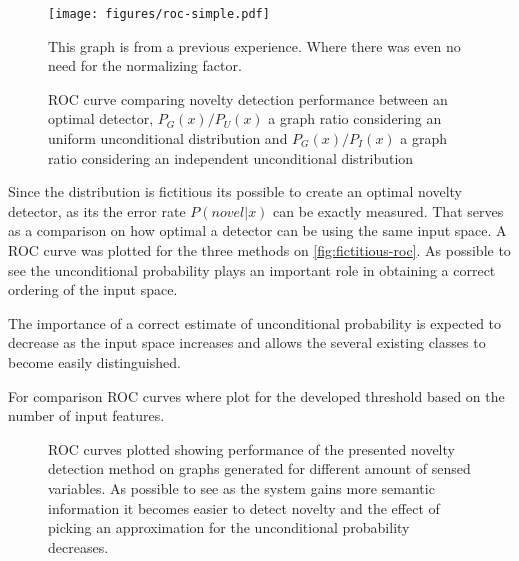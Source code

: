 \documentclass[runningheads,a4paper]{llncs}
\begin{document}
\begin{figure}[h!]
\centering
\texttt{[image: figures/roc-simple.pdf]}

This graph is from a previous experience. Where there was even no need for the normalizing factor.

\caption{\label{fig:fictitious-roc}ROC curve comparing novelty detection performance between an optimal detector,
         $P_G(x)/P_U(x)$ a graph ratio considering an uniform unconditional distribution and
         $P_G(x)/P_I(x)$ a graph ratio considering an independent unconditional distribution}
\end{figure}

Since the distribution is fictitious its possible to create an optimal novelty detector, as
its the error rate $P(novel|x)$ can be exactly measured.
That serves as a comparison on how optimal a detector can be using the same input space.
A ROC curve was plotted for the three methods on \autoref{fig:fictitious-roc}.
As possible to see the unconditional probability plays an important role in obtaining a correct
ordering of the input space.

The importance of a correct estimate of unconditional probability is expected to decrease as the
input space increases and allows the several existing classes to become easily distinguished.

For comparison ROC curves where plot for the developed threshold based on the number of input features.

\begin{figure}[h]
\centering

\qquad
{}

\qquad
{}

\caption{\label{fig:fictitious-roc-breakdown}ROC curves plotted showing performance of the
         presented novelty detection method on graphs generated for different amount of
         sensed variables.
         As possible to see as the system gains more semantic information it becomes easier
         to detect novelty and the effect of picking an approximation for the unconditional
         probability decreases.}
\end{figure}
\end{document}

